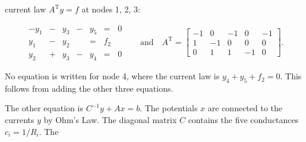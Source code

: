 current law \(A^{\mathrm{T}}y=f\) at nodes 1, 2, 3:

\[\begin{array}{cccccccc}-y_{1}&-&y_{3}&-&y_{5}&=&0\\ y_{1}&-&y_{2}&&=&f_{2}&&\\ y_{2}&+&y_{3}&-&y_{4}&=&0\end{array}\quad\text{and}\quad A^{\mathrm{T}}= \begin{bmatrix}-1&0&-1&0&-1\\ 1&-1&0&0&0\\ 0&1&1&-1&0\end{bmatrix}.\]

No equation is written for node 4, where the current law is \(y_{4}+y_{5}+f_{2}=0\). This follows from adding the other three equations.

The other equation is \(C^{-1}y+Ax=b\). The potentials \(x\) are connected to the currents \(y\) by Ohm's Law. The diagonal matrix \(C\) contains the five conductances \(c_{i}=1/R_{i}\). The 